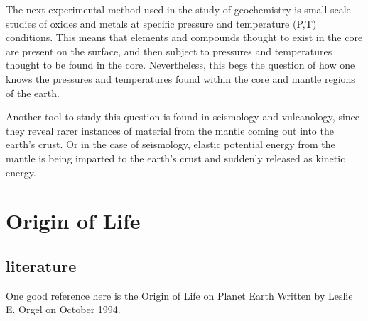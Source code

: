 \documentclass[11]{article}
\begin{document}
The next experimental method used in the study of geochemistry is small scale studies of oxides and metals at specific pressure and temperature (P,T) conditions. This means that elements and compounds thought to exist in the core are present on the surface, and then subject to pressures and temperatures thought to be found in the core. Nevertheless, this begs the question of how one knows the pressures and temperatures found within the core and mantle regions of the earth.

Another tool to study this question is found in seismology and vulcanology, since they reveal rarer instances of material from the mantle coming out into the earth's crust. Or in the case of seismology, elastic potential energy from the mantle is being imparted to the earth's crust and suddenly released as kinetic energy. 

\section{Origin of Life}

\subsection{literature}

One good reference here is the Origin of Life on Planet Earth Written by Leslie E. Orgel on October 1994.
\end{document}
